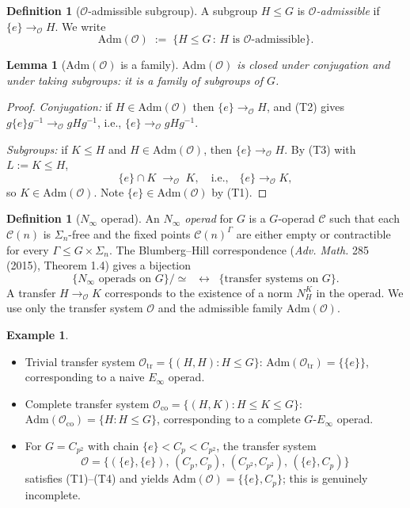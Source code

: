 \documentclass[12pt]{article}
\newtheorem{lemma}[theorem]{Lemma}
\theoremstyle{definition}
\newtheorem{definition}[theorem]{Definition}
\newtheorem{example}[theorem]{Example}
\newcommand{\OO}{\mathcal{O}}
\newcommand{\admis}{\mathrm{Adm}}
\begin{document}
\begin{definition}[$\OO$-admissible subgroup]\label{def:adm}
A subgroup $H\leq G$ is \emph{$\OO$-admissible} if $\{e\}\to_{\OO}H$. We write
\[
\admis(\OO)\;:=\;\{H\leq G\,:\,H\text{ is }\OO\text{-admissible}\}.
\]
\end{definition}

\begin{lemma}[$\admis(\OO)$ is a family]\label{lem:adm-family}
$\admis(\OO)$ is closed under conjugation and under taking subgroups: it is a
family of subgroups of $G$.
\end{lemma}

\begin{proof}
\emph{Conjugation:} if $H\in\admis(\OO)$ then $\{e\}\to_{\OO}H$, and (T2)
gives $g\{e\}g^{-1}\to_{\OO}gHg^{-1}$, i.e., $\{e\}\to_{\OO}gHg^{-1}$.

\emph{Subgroups:} if $K\leq H$ and $H\in\admis(\OO)$, then
$\{e\}\to_{\OO}H$. By (T3) with $L:=K\leq H$,
\[
\{e\}\cap K\;\to_{\OO}\;K,
\quad\text{i.e.,}\quad \{e\}\to_{\OO}K,
\]
so $K\in\admis(\OO)$. Note $\{e\}\in\admis(\OO)$ by (T1).
\end{proof}

\begin{definition}[$N_\infty$ operad]\label{def:Ninfty}
An \emph{$N_\infty$ operad} for $G$ is a $G$-operad $\mathcal{C}$ such that
each $\mathcal{C}(n)$ is $\Sigma_{n}$-free and the fixed points
$\mathcal{C}(n)^{\Gamma}$ are either empty or contractible for every
$\Gamma\leq G\times\Sigma_{n}$. The Blumberg--Hill correspondence (\emph{Adv.
Math.} 285 (2015), Theorem 1.4) gives a bijection
\[
\{N_\infty\text{ operads on }G\}/\simeq
\;\;\longleftrightarrow\;\;
\{\text{transfer systems on }G\}.
\]
A transfer $H\to_{\OO}K$ corresponds to the existence of a norm
$N_{H}^{K}$ in the operad. We use only the transfer system $\OO$ and the
admissible family $\admis(\OO)$.
\end{definition}

\begin{example}\label{ex:trans-systems}
\begin{itemize}
\item Trivial transfer system $\OO_{\mathrm{tr}}=\{(H,H):H\leq G\}$:
$\admis(\OO_{\mathrm{tr}})=\{\{e\}\}$, corresponding to a naive $E_{\infty}$
operad.
\item Complete transfer system $\OO_{\mathrm{co}}=\{(H,K):H\leq K\leq G\}$:
$\admis(\OO_{\mathrm{co}})=\{H:H\leq G\}$, corresponding to a complete
$G$-$E_{\infty}$ operad.
\item For $G=C_{p^{2}}$ with chain $\{e\}<C_{p}<C_{p^{2}}$, the transfer
system
\[\OO=\{(\{e\},\{e\}),\,(C_{p},C_{p}),\,(C_{p^{2}},C_{p^{2}}),\,(\{e\},C_{p})\}\]
satisfies (T1)--(T4) and yields $\admis(\OO)=\{\{e\},C_{p}\}$; this is genuinely
incomplete.
\end{itemize}
\end{example}
\end{document}
